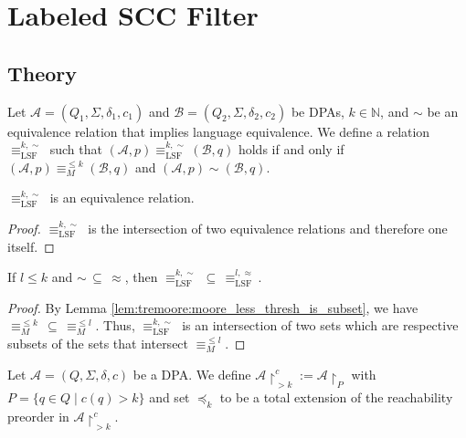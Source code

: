 \chapter{Labeled SCC Filter}
\label{chap:lsf}

\section{Theory}

\begin{defn}
	Let $\mathcal{A} = (Q_1, \Sigma, \delta_1, c_1)$ and $\mathcal{B} = (Q_2, \Sigma, \delta_2, c_2)$ be DPAs, $k \in \mathbb{N}$, and $\sim$ be an equivalence relation that implies language equivalence. We define a relation $\equiv_\text{LSF}^{k,\sim}$ such that $(\mathcal{A}, p) \equiv_\text{LSF}^{k,\sim} (\mathcal{B}, q)$ holds if and only if $(\mathcal{A}, p) \equiv_M^{\leq k} (\mathcal{B}, q)$ and $(\mathcal{A}, p) \sim (\mathcal{B}, q)$.
\end{defn}

\begin{lem}
	$\equiv_\text{LSF}^{k,\sim}$ is an equivalence relation.
\end{lem}

\begin{proof}
	$\equiv_\text{LSF}^{k,\sim}$ is the intersection of two equivalence relations and therefore one itself.
\end{proof}

\begin{lem}
	If $l \leq k$ and $\sim \,\subseteq\, \approx$, then $\equiv_\text{LSF}^{k,\sim} \,\subseteq\, \equiv_\text{LSF}^{l,\approx}$.
\end{lem}

\begin{proof}
	By Lemma \ref{lem:tremoore:moore_less_thresh_is_subset}, we have $\equiv_M^{\leq k} \,\subseteq\, \equiv_M^{\leq l}$. Thus, $\equiv_\text{LSF}^{k,\sim}$ is an intersection of two sets which are respective subsets of the sets that intersect $\equiv_M^{\leq l}$.
\end{proof}

\begin{defn}
	Let $\mathcal{A} = (Q, \Sigma, \delta, c)$ be a DPA. We define $\mathcal{A}\upharpoonright^c_{> k} := \mathcal{A}\upharpoonright_P$ with $P = \{q \in Q \mid c(q) > k\}$ and set $\preceq_k$ to be a total extension of the reachability preorder in $\mathcal{A}\upharpoonright^c_{> k}$.
\end{defn}

